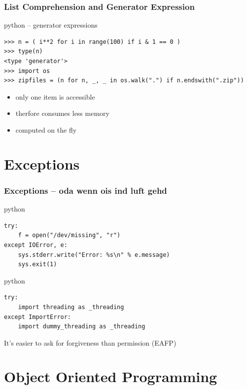 \documentclass{beamer}
\begin{document}
\begin{frame}[fragile]
	\frametitle{List Comprehension and Generator Expression}
	\begin{exampleblock}{python -- generator expressions}
	\begin{lstlisting}
>>> n = ( i**2 for i in range(100) if i & 1 == 0 )
>>> type(n)
<type 'generator'>
>>> import os
>>> zipfiles = (n for n, _, _ in os.walk(".") if n.endswith(".zip"))
	\end{lstlisting}
	\end{exampleblock}
\pause
	\begin{itemize}
		\item only one item is accessible
		\item therfore consumes less memory
		\item computed on the fly
	\end{itemize}
\end{frame}

\section{Exceptions}	%

\begin{frame}[fragile]
	\frametitle{Exceptions -- oda wenn ois ind luft gehd}
	\begin{exampleblock}{python}
	\begin{lstlisting}
try:
    f = open("/dev/missing", "r")
except IOError, e:
    sys.stderr.write("Error: %s\n" % e.message)
    sys.exit(1)
	\end{lstlisting}
	\end{exampleblock}

\pause

	\begin{exampleblock}{python}
	\begin{lstlisting}
try:
    import threading as _threading
except ImportError:
    import dummy_threading as _threading
	\end{lstlisting}
	\end{exampleblock}
	
	It's easier to ask for forgiveness than permission (EAFP)
\end{frame}

\section{Object Oriented Programming}
\end{document}
